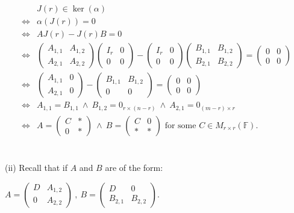 \documentclass{article}
\begin{document}
\begin{align*}
& J(r)\in \ker(\alpha) \\
\iff &\alpha(J(r)) = 0\\
\iff &AJ(r) - J(r)B = 0\\
\iff &\begin{pmatrix}
A_{1,1} & A_{1,2}\\
A_{2,1} & A_{2,2}
\end{pmatrix}\begin{pmatrix}
I_r & 0\\
0 & 0
\end{pmatrix} - \begin{pmatrix}
I_r & 0\\
0 & 0
\end{pmatrix} \begin{pmatrix}
B_{1,1} & B_{1,2}\\
B_{2,1} & B_{2,2}
\end{pmatrix} = \begin{pmatrix}
0 & 0\\
0 & 0
\end{pmatrix}\\
\iff &\begin{pmatrix}
A_{1,1} & 0\\
A_{2,1} & 0
\end{pmatrix} - \begin{pmatrix}
B_{1,1} & B_{1,2}\\
0 & 0
\end{pmatrix} = \begin{pmatrix}
0 & 0\\
0 & 0
\end{pmatrix} \\
\iff & A_{1,1} = B_{1,1}\ \land \ B_{1,2} = 0_{r\times(n-r)}\ \land \ A_{2,1} = 0_{(m-r)\times r}\\ 
\iff & A = \begin{pmatrix}
C & *\\
0 & *
\end{pmatrix}\ \land\ B = \begin{pmatrix}
C & 0\\
* & * 
\end{pmatrix} \text{ for some $C\in M_{r\times r}(\mathbb{F})$}.
\end{align*}\\\\
(ii) Recall that if $A$ and $B$ are of the form:\begin{center}
    $A = \begin{pmatrix}
D & A_{1,2}\\
0 & A_{2,2}
\end{pmatrix} \ , \ B = \begin{pmatrix}
D & 0\\
B_{2,1} & B_{2,2}
\end{pmatrix}$.
\end{center}
\end{document}

